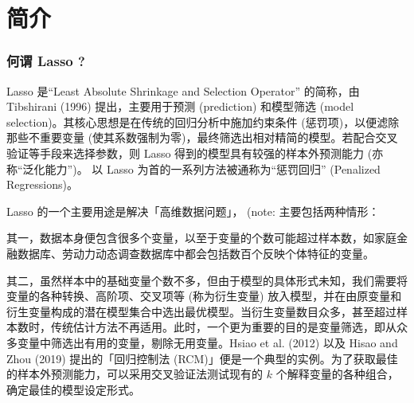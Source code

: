 



\section{简介}\label{sec:lassointro}

\subsubsection{何谓 Lasso ?}
Lasso 是“Least Absolute Shrinkage and Selection Operator” 的简称，由 Tibshirani (1996) 提出，主要用于预测 (prediction) 和模型筛选 (model selection)。其核心思想是在传统的回归分析中施加约束条件 (惩罚项)，以便滤除那些不重要变量 (使其系数强制为零)，最终筛选出相对精简的模型。若配合交叉验证等手段来选择参数，则 Lasso 得到的模型具有较强的样本外预测能力 (亦称“泛化能力”)。
以 Lasso 为首的一系列方法被通称为“惩罚回归” (Penalized Regressions)。

Lasso 的一个主要用途是解决「高维数据问题」， (note: %
主要包括两种情形：

其一，数据本身便包含很多个变量，以至于变量的个数可能超过样本数，如家庭金融数据库、劳动力动态调查数据库中都会包括数百个反映个体特征的变量。

其二，虽然样本中的基础变量个数不多，但由于模型的具体形式未知，我们需要将变量的各种转换、高阶项、交叉项等 (称为衍生变量) 放入模型，并在由原变量和衍生变量构成的潜在模型集合中选出最优模型。当衍生变量数目众多，甚至超过样本数时，传统估计方法不再适用。此时，一个更为重要的目的是变量筛选，即从众多变量中筛选出有用的变量，剔除无用变量。Hsiao et al. (2012) 以及 Hisao and Zhou (2019) 提出的「回归控制法 (RCM)」便是一个典型的实例。为了获取最佳的样本外预测能力，可以采用交叉验证法测试现有的 $k$ 个解释变量的各种组合，确定最佳的模型设定形式。 

